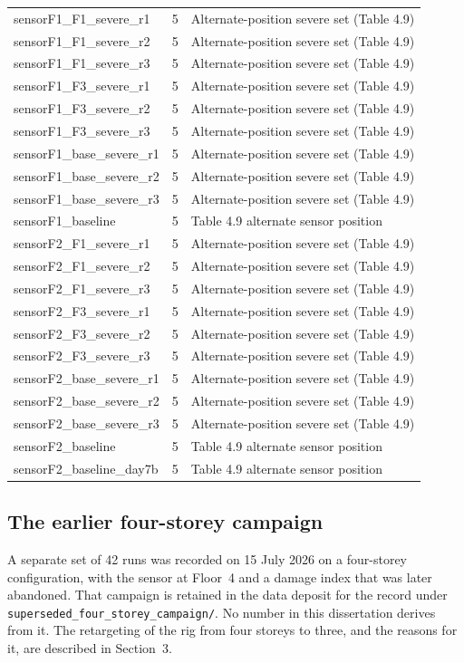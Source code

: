\begin{longtable}{@{}l r >{\raggedright\arraybackslash}p{}@{}}
sensorF1\_F1\_severe\_r1 & 5 & Alternate-position severe set (Table 4.9) \\
sensorF1\_F1\_severe\_r2 & 5 & Alternate-position severe set (Table 4.9) \\
sensorF1\_F1\_severe\_r3 & 5 & Alternate-position severe set (Table 4.9) \\
sensorF1\_F3\_severe\_r1 & 5 & Alternate-position severe set (Table 4.9) \\
sensorF1\_F3\_severe\_r2 & 5 & Alternate-position severe set (Table 4.9) \\
sensorF1\_F3\_severe\_r3 & 5 & Alternate-position severe set (Table 4.9) \\
sensorF1\_base\_severe\_r1 & 5 & Alternate-position severe set (Table 4.9) \\
sensorF1\_base\_severe\_r2 & 5 & Alternate-position severe set (Table 4.9) \\
sensorF1\_base\_severe\_r3 & 5 & Alternate-position severe set (Table 4.9) \\
sensorF1\_baseline & 5 & Table 4.9 alternate sensor position \\
sensorF2\_F1\_severe\_r1 & 5 & Alternate-position severe set (Table 4.9) \\
sensorF2\_F1\_severe\_r2 & 5 & Alternate-position severe set (Table 4.9) \\
sensorF2\_F1\_severe\_r3 & 5 & Alternate-position severe set (Table 4.9) \\
sensorF2\_F3\_severe\_r1 & 5 & Alternate-position severe set (Table 4.9) \\
sensorF2\_F3\_severe\_r2 & 5 & Alternate-position severe set (Table 4.9) \\
sensorF2\_F3\_severe\_r3 & 5 & Alternate-position severe set (Table 4.9) \\
sensorF2\_base\_severe\_r1 & 5 & Alternate-position severe set (Table 4.9) \\
sensorF2\_base\_severe\_r2 & 5 & Alternate-position severe set (Table 4.9) \\
sensorF2\_base\_severe\_r3 & 5 & Alternate-position severe set (Table 4.9) \\
sensorF2\_baseline & 5 & Table 4.9 alternate sensor position \\
sensorF2\_baseline\_day7b & 5 & Table 4.9 alternate sensor position \\
\end{longtable}

\subsection*{The earlier four-storey campaign}

A separate set of 42 runs was recorded on 15 July 2026 on a four-storey
configuration, with the sensor at Floor~4 and a damage index that was later
abandoned. That campaign is retained in the data deposit for the record under
\texttt{superseded\_four\_storey\_campaign/}. No number in this dissertation
derives from it. The retargeting of the rig from four storeys to three, and the
reasons for it, are described in Section~3.
